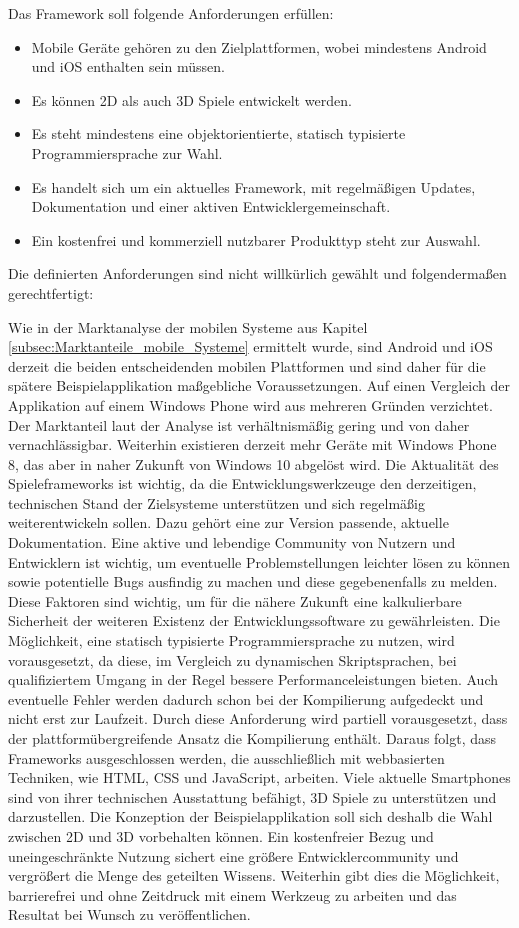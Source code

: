 \bigskip
Das Framework soll folgende Anforderungen erfüllen:
\begin{itemize}
	\item Mobile Geräte gehören zu den Zielplattformen, wobei mindestens Android und iOS enthalten sein müssen.
	\item Es können 2D als auch 3D Spiele entwickelt werden.
	\item Es steht mindestens eine objektorientierte, statisch typisierte Programmiersprache zur Wahl.
	\item Es handelt sich um ein aktuelles Framework, mit regelmäßigen Updates, Dokumentation und einer aktiven Entwicklergemeinschaft.
	\item Ein kostenfrei und kommerziell nutzbarer Produkttyp steht zur Auswahl.
\end{itemize}


Die definierten Anforderungen sind nicht willkürlich gewählt und folgendermaßen gerechtfertigt:

\bigskip
Wie in der Marktanalyse der mobilen Systeme aus Kapitel \ref{subsec:Marktanteile_mobile_Systeme} ermittelt wurde, sind Android und iOS derzeit die beiden entscheidenden mobilen Plattformen und sind daher für die spätere Beispielapplikation maßgebliche Voraussetzungen. 
Auf einen Vergleich der Applikation auf einem Windows Phone wird aus mehreren Gründen verzichtet. Der Marktanteil laut der Analyse ist verhältnismäßig gering und von daher vernachlässigbar. Weiterhin existieren derzeit mehr Geräte mit Windows Phone 8, das aber in naher Zukunft von Windows 10 abgelöst wird.
Die Aktualität des Spieleframeworks ist wichtig, da die Entwicklungswerkzeuge den derzeitigen, technischen Stand der Zielsysteme unterstützen und sich regelmäßig weiterentwickeln sollen. Dazu gehört eine zur Version passende, aktuelle Dokumentation. Eine aktive und lebendige Community von Nutzern und Entwicklern ist wichtig, um eventuelle Problemstellungen leichter lösen zu können sowie potentielle Bugs ausfindig zu machen und diese gegebenenfalls zu melden. Diese Faktoren sind wichtig, um für die nähere Zukunft eine kalkulierbare Sicherheit der weiteren Existenz der Entwicklungssoftware zu gewährleisten. Die Möglichkeit, eine statisch typisierte Programmiersprache zu nutzen, wird vorausgesetzt, da diese, im Vergleich zu dynamischen Skriptsprachen, bei qualifiziertem Umgang in der Regel bessere Performanceleistungen bieten. Auch eventuelle Fehler werden dadurch schon bei der Kompilierung aufgedeckt und nicht erst zur Laufzeit. Durch diese Anforderung wird partiell vorausgesetzt, dass der plattformübergreifende Ansatz die Kompilierung enthält. Daraus folgt, dass Frameworks ausgeschlossen werden, die ausschließlich mit webbasierten Techniken, wie HTML, CSS und JavaScript, arbeiten. Viele aktuelle Smartphones sind von ihrer technischen Ausstattung befähigt, 3D Spiele zu unterstützen und darzustellen. Die Konzeption der Beispielapplikation soll sich deshalb die Wahl zwischen 2D und 3D vorbehalten können. Ein kostenfreier Bezug und uneingeschränkte Nutzung sichert eine größere Entwicklercommunity und vergrößert die Menge des geteilten Wissens. Weiterhin gibt dies die Möglichkeit, barrierefrei und ohne Zeitdruck mit einem Werkzeug zu arbeiten und das Resultat bei Wunsch zu veröffentlichen.

